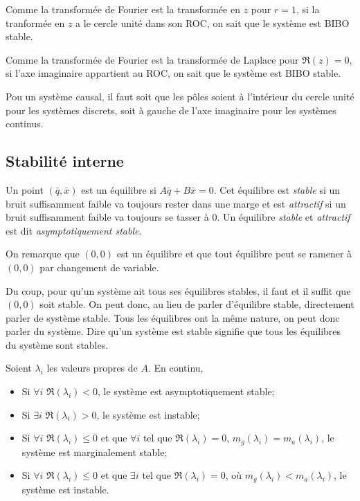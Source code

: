 Comme la transformée de Fourier
est la transformée en $z$ pour $r = 1$,
si la tranformée en $z$ a le cercle unité dans son ROC, on sait
que le système est BIBO stable.

Comme la transformée de Fourier est la transformée de Laplace pour $\Re(z) = 0$,
si l'axe imaginaire appartient au ROC, on sait
que le système est BIBO stable.

Pou un système causal, il faut soit que les pôles soient
à l'intérieur du cercle unité pour les systèmes discrets, soit
à gauche de l'axe imaginaire pour les systèmes continus.

\subsection{Stabilité interne}
Un point $(\bar{q}, \bar{x})$ est un équilibre si $A\bar{q} + B\bar{x} = 0$.
Cet équilibre est \emph{stable} si un bruit suffisamment faible
va toujours rester dans une marge et est \emph{attractif} si
un bruit suffisamment faible va toujours se tasser à 0.
Un équilibre \emph{stable} et \emph{attractif}
est dit \emph{asymptotiquement stable}.

On remarque que $(0,0)$ est un équilibre et que tout équilibre peut se
ramener à $(0,0)$ par changement de variable.

Du coup, pour qu'un système ait tous ses équilibres stables,
il faut et il suffit que $(0,0)$ soit stable.
On peut donc, au lieu de parler d'équilibre stable,
directement parler de système stable.
Tous les équilibres ont la même nature,
on peut donc parler du système.
Dire qu'un système est stable
signifie que tous les équilibres du système sont stables.

Soient $\lambda_i$ les valeurs propres de $A$.
En continu,
\begin{itemize}
  \item Si $\forall i$ $\Re(\lambda_i) < 0$, le système est asymptotiquement
    stable;
  \item Si $\exists i$ $\Re(\lambda_i) > 0$, le système est instable;
  \item Si $\forall i$ $\Re(\lambda_i) \leq 0$ et que $\forall i$ tel que
    $\Re(\lambda_i) = 0$, $m_g(\lambda_i) = m_a(\lambda_i)$,
    le système est marginalement stable;
  \item Si $\forall i$ $\Re(\lambda_i) \leq 0$ et que $\exists i$ tel que
    $\Re(\lambda_i) = 0$, où $m_g(\lambda_i) < m_a(\lambda_i)$,
    le système est instable.
\end{itemize}

